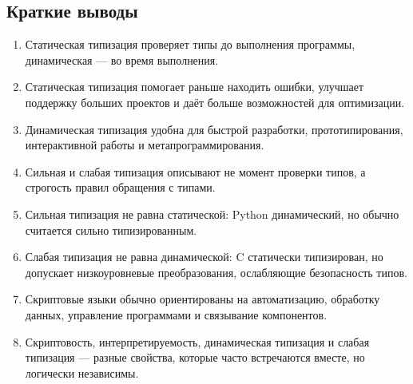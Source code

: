 \documentclass[12pt,a4paper]{article}
\begin{document}
\subsection{Краткие выводы}

\begin{enumerate}
    \item Статическая типизация проверяет типы до выполнения программы, динамическая ---
    во время выполнения.

    \item Статическая типизация помогает раньше находить ошибки, улучшает поддержку
    больших проектов и даёт больше возможностей для оптимизации.

    \item Динамическая типизация удобна для быстрой разработки, прототипирования,
    интерактивной работы и метапрограммирования.

    \item Сильная и слабая типизация описывают не момент проверки типов, а строгость
    правил обращения с типами.

    \item Сильная типизация не равна статической: Python динамический, но обычно
    считается сильно типизированным.

    \item Слабая типизация не равна динамической: C статически типизирован, но допускает
    низкоуровневые преобразования, ослабляющие безопасность типов.

    \item Скриптовые языки обычно ориентированы на автоматизацию, обработку данных,
    управление программами и связывание компонентов.

    \item Скриптовость, интерпретируемость, динамическая типизация и слабая типизация
    --- разные свойства, которые часто встречаются вместе, но логически независимы.
\end{enumerate}
\end{document}
